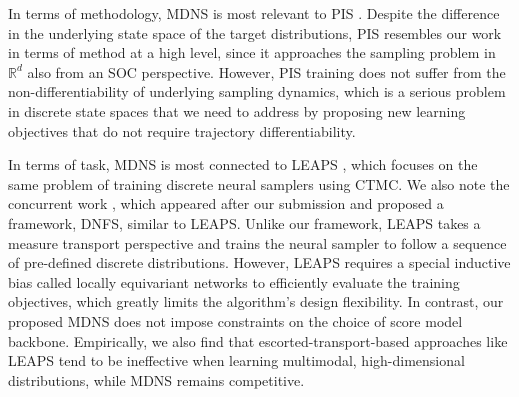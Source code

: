 \documentclass{article}
\theoremstyle{remark}
\newcommand{\R}{\mathbb{R}}
\begin{document}
In terms of methodology, MDNS is most relevant to PIS \cite{zhang2022path}. Despite the difference in the underlying state space of the target distributions, PIS resembles our work in terms of method at a high level, since it approaches the sampling problem in $\R^d$ also from an SOC perspective. However, PIS training does not suffer from the non-differentiability of underlying sampling dynamics, which is a serious problem in discrete state spaces that we need to address by proposing new learning objectives that do not require trajectory differentiability. 

In terms of task, MDNS is most connected to LEAPS \cite{holderrieth2025leaps}, which focuses on the same problem of training discrete neural samplers using CTMC. We also note the concurrent work \cite{ou2025discrete}, which appeared after our submission and proposed a framework, DNFS, similar to LEAPS. Unlike our framework, LEAPS takes a measure transport perspective and trains the neural sampler to follow a sequence of pre-defined discrete distributions. However, LEAPS requires a special inductive bias called locally equivariant networks to efficiently evaluate the training objectives, which greatly limits the algorithm's design flexibility. In contrast, our proposed MDNS does not impose constraints on the choice of score model backbone. Empirically, we also find that escorted-transport-based approaches like LEAPS tend to be ineffective when learning multimodal, high-dimensional distributions, while MDNS remains competitive.
\end{document}
